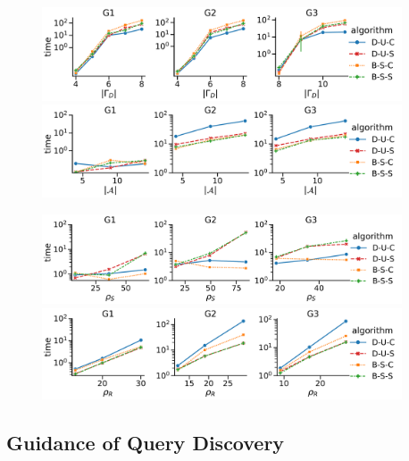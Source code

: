 \begin{figure}
	\centering
	\begin{minipage}[c]{0.49\textwidth}
		\includegraphics[width=0.95\textwidth]{img/rw_alphabet.pdf}
		\includegraphics[width=0.95\textwidth]{img/rw_attributes_v2.pdf}
		
\end{minipage}
\begin{minipage}[c]{0.49\textwidth}
	\includegraphics[width=0.95\textwidth]{img/rw_types.pdf}
	
	\includegraphics[width=0.95\textwidth]{img/rw_pattern.pdf}
\end{minipage}
\vspace{-1em}
\caption{}
\label{fig:rw-synt}
\vspace{-.5em}
\end{figure}


\subsection{Guidance of Query Discovery}
\label{sec:exp_guidance}

